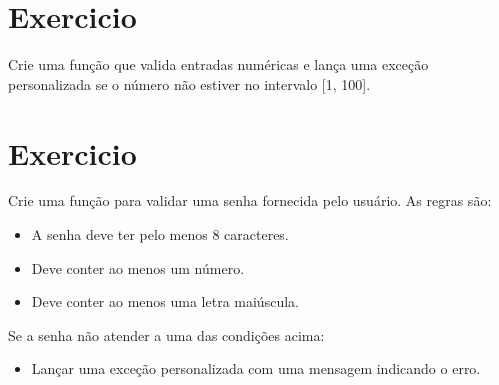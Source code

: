 \section{Exercicio}

Crie uma função que valida entradas numéricas e lança uma exceção personalizada se o número não estiver no intervalo [1, 100].


\section{Exercicio}

Crie uma função para validar uma senha fornecida pelo usuário. As regras são:
\begin{itemize}
    \item A senha deve ter pelo menos 8 caracteres.
    \item Deve conter ao menos um número.
    \item Deve conter ao menos uma letra maiúscula.
\end{itemize}

Se a senha não atender a uma das condições acima:
\begin{itemize}
    \item Lançar uma exceção personalizada com uma mensagem indicando o erro.
\end{itemize}




